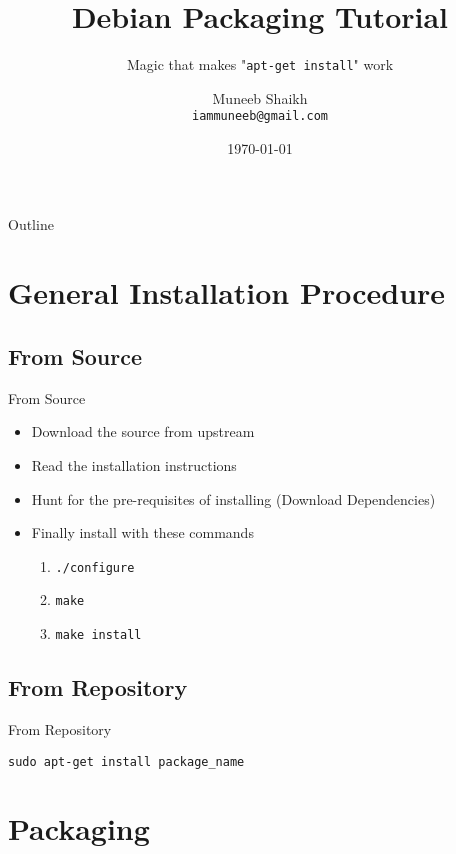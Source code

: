 \documentclass[red,10pt,a4paper]{beamer}
\title{Debian Packaging Tutorial}
\subtitle{Magic that makes "\texttt{apt-get install}" work}
\author[Muneeb]{Muneeb Shaikh \\ \texttt{iammuneeb@gmail.com}}
\date{\today}
\begin{document}
\begin{frame}
    \titlepage
\end{frame}




\begin{frame}{Outline}
  \tableofcontents[hideallsubsections]
\end{frame}

\section{General Installation Procedure}
\subsection{From Source}

\begin{frame}{From Source}
	\begin{itemize}
		\item Download the source from upstream
			\br
		\item Read the installation instructions
			\br
		\item Hunt for the pre-requisites of installing (Download Dependencies)
			\br
		\item Finally install with these commands
			\begin{enumerate}
				\item \texttt{./configure}
					\hbr
				\item \texttt{make}
					\hbr
				\item \texttt{make install}
			\end{enumerate}
	\end{itemize}
\end{frame}

\subsection{From Repository}

\begin{frame}{From Repository}
\begin{center}
\large{\texttt{sudo apt-get install package\_name}}
\end{center}
\end{frame}

\section{Packaging}
\end{document}
